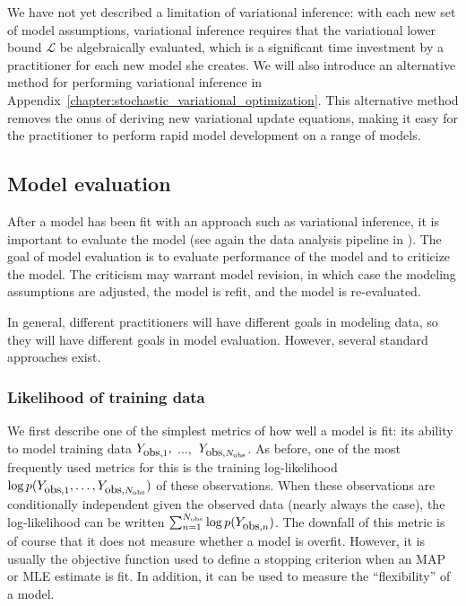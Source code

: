 We have not yet described a limitation of variational inference: with
each new set of model assumptions, variational inference requires that
the variational lower bound $\mathcal{L}$ be algebraically evaluated,
which is a significant time investment by a practitioner for each new
model she creates.  We will also introduce an alternative method for
performing variational inference in
Appendix~\ref{chapter:stochastic_variational_optimization}.  This
alternative method removes the onus of deriving new variational update
equations, making it easy for the practitioner to perform rapid model
development on a range of models.


\subsection{Model evaluation}

After a model has been fit with an approach such as variational
inference, it is important to evaluate the model (see again the data
analysis pipeline in ).  The goal of
model evaluation is to evaluate performance of the model and to
criticize the model.  The criticism may warrant model revision, in
which case the modeling assumptions are adjusted, the model is refit,
and the model is re-evaluated.

In general, different practitioners will have different goals in
modeling data, so they will have different goals in model evaluation.
However, several standard approaches exist.

\subsubsection{Likelihood of training data}
We first describe one of the simplest metrics of how well a model is
fit: its ability to model training data $Y_{\mbox{\small obs},1},$
$\ldots,$ $Y_{\mbox{\small obs},N_{\mbox{\tiny obs}}}$.  As before,
one of the most frequently used metrics for this is the training
log-likelihood $\log p(Y_{\mbox{\small obs},1}, \ldots,
Y_{\mbox{\small obs},N_{\mbox{\tiny obs}}})$ of these
observations. When these observations are conditionally independent
given the observed data (nearly always the case), the log-likelihood
can be written $\sum_{n=1}^{N_{\mbox{\tiny obs}}} \log
p(Y_{\mbox{\small obs},n})$.  The downfall of this metric is of course
that it does not measure whether a model is overfit.  However, it is
usually the objective function used to define a stopping criterion
when an MAP or MLE estimate is fit.  In addition, it can be used to
measure the ``flexibility'' of a model.

